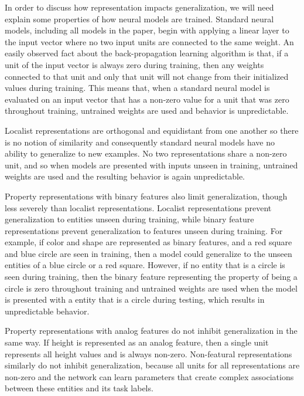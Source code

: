 In order to discuss how representation impacts generalization, we will need explain some properties of how neural models are trained. Standard neural models, including all models in the paper, begin with applying a linear layer to the input vector where no two input units are connected to the same weight. An easily observed fact about the back-propagation learning algorithm is that, if a unit of the input vector is always zero during training, then any weights connected to that unit and only that unit will not change from their initialized values during training. This means that, when a standard neural model is evaluated on an input vector that has a non-zero value for a unit that was zero throughout training, untrained weights are used and behavior is unpredictable.

Localist representations are orthogonal and equidistant from one another so there is no notion of similarity and consequently standard neural models have no ability to generalize to new examples. No two representations share a non-zero unit, and so when models are presented with inputs unseen in training, untrained weights are used and the resulting behavior is again unpredictable.

Property representations with binary features also limit generalization, though less severely than localist representations. Localist representations prevent generalization to entities unseen during training, while binary feature representations prevent generalization to features unseen during training. For example, if color and shape are represented as binary features, and a red square and blue circle are seen in training, then a model could generalize to the unseen entities of a blue circle or a red square. However, if no entity that is a circle is seen during training, then the binary feature representing the property of being a circle is zero throughout training and untrained weights are used when the model is presented with a entity that is a circle during testing, which results in unpredictable behavior.

Property representations with analog features do not inhibit generalization in the same way. If height is represented as an analog feature, then a single unit represents all height values and is always non-zero. Non-featural representations similarly do not inhibit generalization, because all units for all representations are non-zero and the network can learn parameters that create complex associations between these entities and its task labels.


